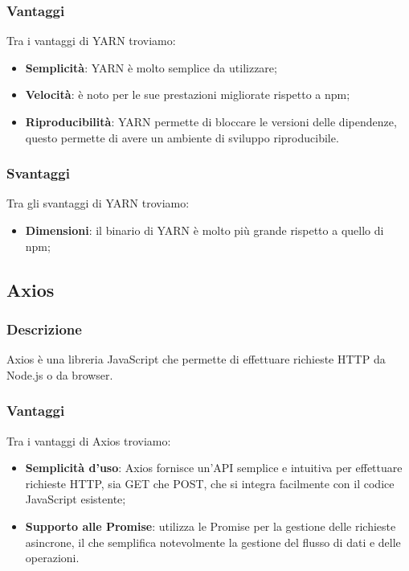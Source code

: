 \subsubsection*{Vantaggi}
Tra i vantaggi di YARN troviamo:
\begin{itemize}
    \item \textbf{Semplicità}: YARN è molto semplice da utilizzare;
    \item \textbf{Velocità}: è noto per le sue prestazioni migliorate rispetto a npm;
    \item \textbf{Riproducibilità}: YARN permette di bloccare le versioni delle dipendenze, questo permette di avere un ambiente di sviluppo riproducibile.
\end{itemize}

\subsubsection*{Svantaggi}
Tra gli svantaggi di YARN troviamo:
\begin{itemize}
    \item \textbf{Dimensioni}: il binario di YARN è molto più grande rispetto a quello di npm;
\end{itemize}


\subsection*{Axios}

\subsubsection*{Descrizione}
Axios è una libreria JavaScript che permette di effettuare richieste HTTP da Node.js o da browser.

\subsubsection*{Vantaggi}
Tra i vantaggi di Axios troviamo:
\begin{itemize}
    \item \textbf{Semplicità d'uso}: Axios fornisce un'API semplice e intuitiva per effettuare richieste HTTP, sia GET che POST, che si integra facilmente con il codice JavaScript esistente;
    \item \textbf{Supporto alle Promise}: utilizza le Promise per la gestione delle richieste asincrone, il che semplifica notevolmente la gestione del flusso di dati e delle operazioni.
\end{itemize}

